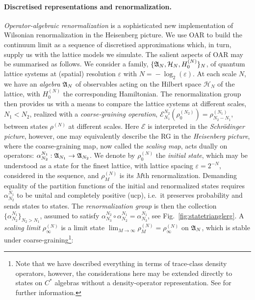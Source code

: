 \documentclass[12pt]{article}
\newcommand{\cE}{\mathcal E}
\newcommand{\cH}{\mathcal H}\newcommand{\fH}{\mathfrak H}\newcommand{\scrH}{\mathscr H}
\newcommand{\1}{\mathds{1}}
\newcommand{\vep}{\varepsilon}
\begin{document}
\paragraph*{Discretised representations and renormalization.}
\emph{Operator-algebraic renormalization} \cite{stottmeisterOperatoralgebraicRenormalizationWavelets2020,morinelliScalingLimitsLattice2020,brothierCanonicalQuantization1dimensional2019,osborneContinuumLimitsQuantum2019} is a sophisticated new implementation of Wilsonian renormalization in the Heisenberg picture. We use OAR to build the continuum limit as a sequence of discretised approximations which, in turn, supply us with the lattice models we simulate. The salient aspects of OAR may be summarised as follows. We consider a family, $\{\fA_{N},\cH_{N},H^{(N)}_{0}\}_{N}$, of quantum lattice systems at (spatial) resolution $\vep$ with $N\!=\!-\log_2(\vep)$. At each scale $N$, we have an \emph{algebra} $\mathfrak A_{N}$ of observables acting on the Hilbert space $\cH_{N}$ of the lattice, with $H^{(N)}_{0}$ the corresponding Hamiltonian. The renormalization group then provides us with a means to compare the lattice systems at different scales, $N_1 < N_2$, realized with a \emph{coarse-graining operation}, $\cE^{N_{2}}_{N_{1}}\!(\rho^{(N_{2})}_{0})\!=\!\rho^{(N_{1})}_{N_{2}-N_{1}}$, between states $\rho^{(N)}$ at different scales. Here $\mathcal{E}$ is interpreted in the \emph{Schrödinger picture}, however, one may equivalently describe the RG in the \emph{Heisenberg picture}, where the coarse-graining map, now called the \emph{scaling map}, acts dually on operators: $\alpha^{N_{1}}_{N_{2}}:\mathfrak A_{N_{1}}\rightarrow\mathfrak A_{N_{2}}$. We denote by $\rho^{(N)}_{0}$ the \emph{initial state}, which may be understood as a state for the finest lattice, with lattice spacing $\vep = 2^{-N}$, considered in the sequence, and $\rho^{(N)}_{M}$ is its $M$th renormalization. Demanding equality of the partition functions of the initial and renormalized states requires $\alpha^{N_{1}}_{N_{2}}$ to be unital and completely positive (ucp), i.e.~it preserves probability and sends states to states.
The \emph{renormalization group} is then the collection $\{\alpha^{N_{1}}_{N_{2}}\}_{N_{2}>N_{1}}$, assumed to satisfy $\alpha^{N_{2}}_{N_{3}}\circ\alpha^{N_{1}}_{N_{2}}\!=\!\alpha^{N_{1}}_{N_{3}}$, see Fig.~\ref{fig:statetrianglerg}.
A \textit{scaling limit} $\rho^{(N)}_{\infty}$ is a limit state $\lim_{M\rightarrow\infty}\rho^{(N)}_{M}\!=\!\rho^{(N)}_{\infty}$ on $\mathfrak A_N$, which is stable under coarse-graining\footnote{Note that we have described everything in terms of trace-class density operators, however, the considerations here may be extended directly to states on $C^*$ algebras without a density-operator representation. See \cite{osborneConformal2021} for further information.}:
\end{document}
